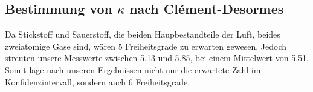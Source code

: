 \subsection{Bestimmung von $ \kappa $ nach Clément-Desormes}
Da Stickstoff und Sauerstoff, die beiden Haupbestandteile der Luft, beides zweiatomige Gase sind, wären $ 5 $ Freiheitsgrade zu erwarten gewesen. Jedoch streuten unsere Messwerte zwischen \num{5.13} und \num{5.85}, bei einem Mittelwert von \num{5.51}. Somit läge nach unseren Ergebnissen nicht nur die erwartete Zahl im Konfidenzintervall, sondern auch \num{6} Freiheitsgrade.\\
